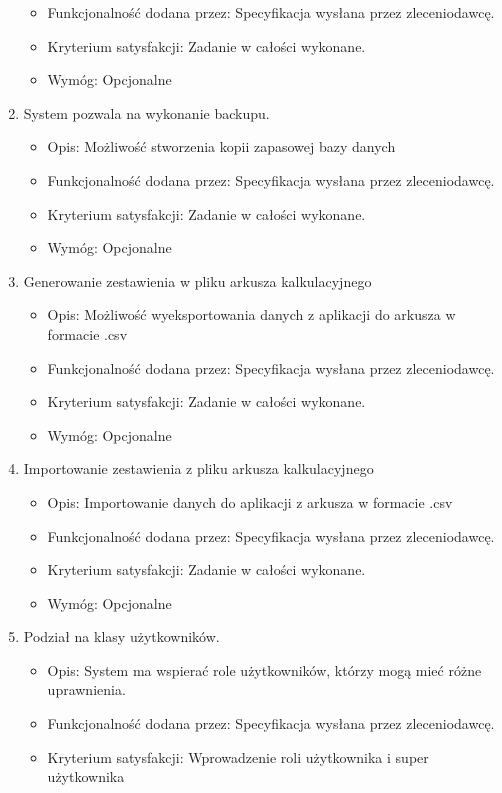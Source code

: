 \documentclass{article}
\begin{document}
\begin{enumerate}
\begin{itemize}
\item Funkcjonalność dodana przez: Specyfikacja wysłana przez zleceniodawcę.
\item Kryterium satysfakcji: Zadanie w całości wykonane.
\item Wymóg: Opcjonalne
\end{itemize}
\item System pozwala na wykonanie backupu.
\begin{itemize}
\item Opis: Możliwość stworzenia kopii zapasowej bazy danych
\item Funkcjonalność dodana przez: Specyfikacja wysłana przez zleceniodawcę.
\item Kryterium satysfakcji: Zadanie w całości wykonane.
\item Wymóg: Opcjonalne
\end{itemize}
\item Generowanie zestawienia w pliku arkusza kalkulacyjnego
\begin{itemize}
\item Opis: Możliwość wyeksportowania danych z aplikacji do arkusza w formacie .csv
\item Funkcjonalność dodana przez: Specyfikacja wysłana przez zleceniodawcę.
\item Kryterium satysfakcji: Zadanie w całości wykonane.
\item Wymóg: Opcjonalne
\end{itemize}
\item Importowanie zestawienia z pliku arkusza kalkulacyjnego
\begin{itemize}
\item Opis: Importowanie danych do aplikacji z arkusza w formacie .csv
\item Funkcjonalność dodana przez: Specyfikacja wysłana przez zleceniodawcę.
\item Kryterium satysfakcji: Zadanie w całości wykonane.
\item Wymóg: Opcjonalne
\end{itemize}
\item Podział na klasy użytkowników.
\begin{itemize}
\item Opis: System ma wspierać role użytkowników, którzy mogą mieć różne uprawnienia.
\item Funkcjonalność dodana przez: Specyfikacja wysłana przez zleceniodawcę.
\item Kryterium satysfakcji: Wprowadzenie roli użytkownika i super użytkownika

\end{itemize}
\end{enumerate}
\end{document}
